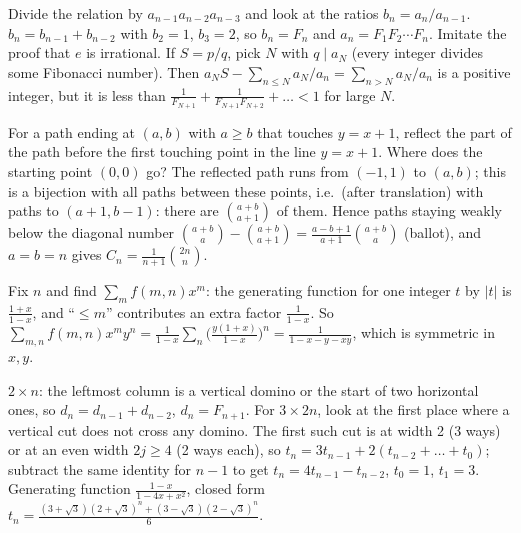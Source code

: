 \documentclass[11pt,a4paper]{article}
\begin{document}
Divide the relation by \(a_{n-1}a_{n-2}a_{n-3}\) and look at the ratios \(b_n=a_n/a_{n-1}\).
\(b_n=b_{n-1}+b_{n-2}\) with \(b_2=1\), \(b_3=2\), so \(b_n=F_n\) and \(a_n=F_1F_2\cdots F_n\).
Imitate the proof that \(e\) is irrational. If \(S=p/q\), pick \(N\) with \(q\mid a_N\) (every integer divides some Fibonacci number). Then \(a_NS-\sum_{n\le N}a_N/a_n=\sum_{n\gt N}a_N/a_n\) is a positive integer, but it is less than \(\frac1{F_{N+1}}+\frac1{F_{N+1}F_{N+2}}+\dots\lt1\) for large \(N\).

For a path ending at \((a,b)\) with \(a\ge b\) that touches \(y=x+1\), reflect the part of the path before the first touching point in the line \(y=x+1\). Where does the starting point \((0,0)\) go?
The reflected path runs from \((-1,1)\) to \((a,b)\); this is a bijection with all paths between these points, i.e.~(after translation) with paths to \((a+1,b-1)\): there are \(\binom{a+b}{a+1}\) of them. Hence paths staying weakly below the diagonal number \(\binom{a+b}{a}-\binom{a+b}{a+1}=\frac{a-b+1}{a+1}\binom{a+b}a\) (ballot), and \(a=b=n\) gives \(C_n=\frac1{n+1}\binom{2n}n\).

Fix \(n\) and find \(\sum_m f(m,n)x^m\): the generating function for one integer \(t\) by \(\lvert t\rvert\) is \(\frac{1+x}{1-x}\), and ``\(\le m\)'' contributes an extra factor \(\frac1{1-x}\).
So \(\sum_{m,n}f(m,n)x^my^n=\frac1{1-x}\sum_n\Big(\frac{y(1+x)}{1-x}\Big)^n=\frac1{1-x-y-xy}\), which is symmetric in \(x,y\).

\(2\times n\): the leftmost column is a vertical domino or the start of two horizontal ones, so \(d_n=d_{n-1}+d_{n-2}\), \(d_n=F_{n+1}\). For \(3\times2n\), look at the first place where a vertical cut does not cross any domino.
The first such cut is at width 2 (3 ways) or at an even width \(2j\ge4\) (2 ways each), so \(t_n=3t_{n-1}+2(t_{n-2}+\dots+t_0)\); subtract the same identity for \(n-1\) to get \(t_n=4t_{n-1}-t_{n-2}\), \(t_0=1\), \(t_1=3\).
Generating function \(\frac{1-x}{1-4x+x^2}\), closed form \(t_n=\frac{(3+\sqrt3)(2+\sqrt3)^n+(3-\sqrt3)(2-\sqrt3)^n}{6}\).
\end{document}
